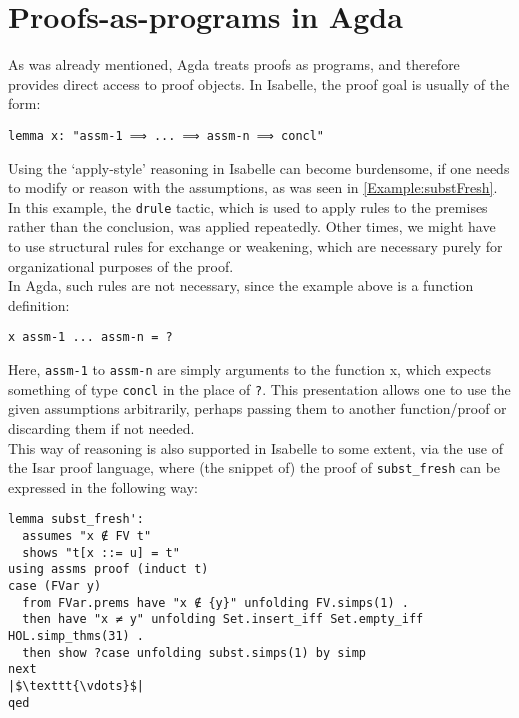 \documentclass[a4paper, 12pt, twoside]{style/ociamthesis}
\theoremstyle{plain}
\theoremstyle{definition}
\theoremstyle{remark}
\begin{document}
\section{Proofs-as-programs in Agda}\label{proofs-as-programs-in-agda}

\label{proofAsProg}

As was already mentioned, Agda treats proofs as programs, and therefore
provides direct access to proof objects. In Isabelle, the proof goal is
usually of the form:

\begin{verbatim}
lemma x: "assm-1 ⟹ ... ⟹ assm-n ⟹ concl"
\end{verbatim}

Using the `apply-style' reasoning in Isabelle can become burdensome, if
one needs to modify or reason with the assumptions, as was seen in
\cref{Example:substFresh}. In this example, the \texttt{drule} tactic,
which is used to apply rules to the premises rather than the conclusion,
was applied repeatedly. Other times, we might have to use structural
rules for exchange or weakening, which are necessary purely for
organizational purposes of the proof.\\
In Agda, such rules are not necessary, since the example above is a
function definition:

\begin{verbatim}
x assm-1 ... assm-n = ?
\end{verbatim}

Here, \texttt{assm-1} to \texttt{assm-n} are simply arguments to the
function x, which expects something of type \texttt{concl} in the place
of \texttt{?}. This presentation allows one to use the given assumptions
arbitrarily, perhaps passing them to another function/proof or
discarding them if not needed.\\
This way of reasoning is also supported in Isabelle to some extent, via
the use of the Isar proof language, where (the snippet of) the proof of
\texttt{subst\_fresh} can be expressed in the following way:

\begin{verbatim}
lemma subst_fresh': 
  assumes "x ∉ FV t"
  shows "t[x ::= u] = t"
using assms proof (induct t)
case (FVar y)
  from FVar.prems have "x ∉ {y}" unfolding FV.simps(1) .
  then have "x ≠ y" unfolding Set.insert_iff Set.empty_iff HOL.simp_thms(31) .
  then show ?case unfolding subst.simps(1) by simp
next
|$\texttt{\vdots}$|
qed
\end{verbatim}
\end{document}
